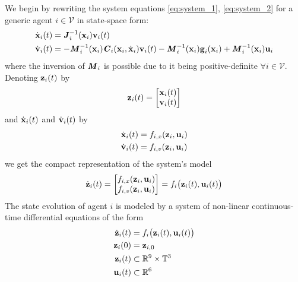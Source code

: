 We begin by rewriting the system equations \eqref{eq:system_1},
\eqref{eq:system_2} for a generic agent $i \in \mathcal{V}$ in state-space form:
\begin{subequations}
\begin{align}
  \dot{\bm{\mathbf{x}}}_i(t) &= \bm{\mathit{J}}_i^{-1}(\bm{\mathbf{x}}_i) \bm{\mathbf{v}}_i(t) \\
  \dot{\bm{\mathbf{v}}}_i(t) &= -\bm{\mathit{M}}_i^{-1}(\bm{\mathbf{x}}_i)\bm{\mathit{C}}_i(\bm{\mathbf{x}}_i,\dot{\bm{\mathbf{x}}}_i) \bm{\mathbf{v}}_i(t)
    - \bm{\mathit{M}}_i^{-1}(\bm{\mathbf{x}}_i)\bm{\mathbf{g}}_i(\bm{\mathbf{x}}_i)
    + \bm{\mathit{M}}_i^{-1}(\bm{\mathbf{x}}_i)\bm{\mathbf{u}}_i
\end{align}
\label{eq:state_space_system}
\end{subequations}
where the inversion of $\bm{\mathit{M}}_i$ is possible due to it being
positive-definite $\forall i \in \mathcal{V}$. Denoting $\bm{\mathbf{z}}_i(t)$ by
\begin{align}
  \bm{\mathbf{z}}_i(t) =
    \begin{bmatrix}
      \bm{\mathbf{x}}_i(t) \\
      \bm{\mathbf{v}}_i(t) \\
    \end{bmatrix}
\end{align}
and
$\dot{\bm{\mathbf{x}}}_i(t)$ and $\dot{\bm{\mathbf{v}}}_i(t)$ by
\begin{subequations}
\begin{align}
  \dot{\bm{\mathbf{x}}}_i(t) &= f_{i,x}(\bm{\mathbf{z}}_i, \bm{\mathbf{u}}_i) \\
  \dot{\bm{\mathbf{v}}}_i(t) &= f_{i,v}(\bm{\mathbf{z}}_i, \bm{\mathbf{u}}_i)
\end{align}
\end{subequations}
we get the compact representation of the system's model
\begin{align}
  \dot{\bm{\mathbf{z}}}_i(t) =
    \begin{bmatrix}
      f_{i,x}(\bm{\mathbf{z}}_i, \bm{\mathbf{u}}_i) \\
      f_{i,v}(\bm{\mathbf{z}}_i, \bm{\mathbf{u}}_i) \\
    \end{bmatrix} =
 f_i \big(\bm{\mathbf{z}}_i (t), \bm{\mathbf{u}}_i (t)\big)
\end{align}
The state evolution of agent $i$ is modeled by a system of non-linear
continuous-time differential equations of the form
\begin{align}
  \dot{\bm{\mathbf{z}}}_i(t) &= f_i \big(\bm{\mathbf{z}}_i (t), \bm{\mathbf{u}}_i (t)\big) \label{eq:non_perturbed_system}\\
  \bm{\mathbf{z}}_i(0) &= \bm{\mathbf{z}}_{i,0} \\
  \bm{\mathbf{z}}_i (t) & \subset \mathbb{R}^{9} \times \mathbb{T}^3 \\
  \bm{\mathbf{u}}_i (t) & \subset \mathbb{R}^6
\end{align}
